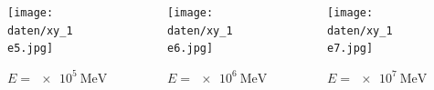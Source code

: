 \documentclass[aspectratio=1610, captions=tableheading, 11pt]{beamer}
\begin{document}
\begin{frame}
   \vspace{-5mm}
  \begin{columns}
    \begin{column}{0.33\textwidth}
      \begin{figure}
          \centering
          \texttt{[image: daten/xy\_1e5.jpg]}
          \caption*{$E = \SI{e5}{\mega\electronvolt}$}
      \end{figure}
    \end{column}


    \begin{column}{0.33\textwidth}
      \begin{figure}
          \centering
          \texttt{[image: daten/xy\_1e6.jpg]}
          \caption*{$E = \SI{e6}{\mega\electronvolt}$}
      \end{figure}
    \end{column}

    \begin{column}{0.33\textwidth}
      \begin{figure}
          \centering
          \texttt{[image: daten/xy\_1e7.jpg]}
          \caption*{$E = \SI{e7}{\mega\electronvolt}$}
      \end{figure}    
    \end{column}
  \end{columns}
\end{frame}
\end{document}
